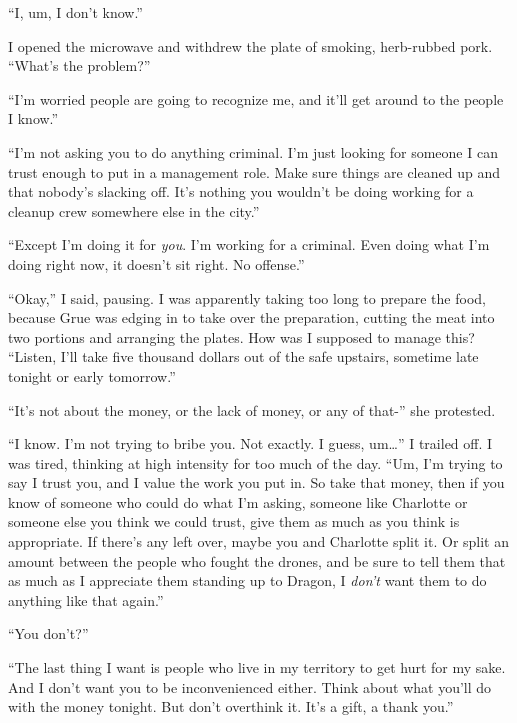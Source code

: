 ``I, um, I don't know.''



I opened the microwave and withdrew the plate of smoking, herb-rubbed pork.  ``What's the problem?''



``I'm worried people are going to recognize me, and it'll get around to the people I know.''



``I'm not asking you to do anything criminal.  I'm just looking for someone I can trust enough to put in a management role.  Make sure things are cleaned up and that nobody's slacking off.  It's nothing you wouldn't be doing working for a cleanup crew somewhere else in the city.''



``Except I'm doing it for \emph{you}.  I'm working for a criminal.  Even doing what I'm doing right now, it doesn't sit right.  No offense.''



``Okay,'' I said, pausing.  I was apparently taking too long to prepare the food, because Grue was edging in to take over the preparation, cutting the meat into two portions and arranging the plates.  How was I supposed to manage this?  ``Listen, I'll take five thousand dollars out of the safe upstairs, sometime late tonight or early tomorrow.''



``It's not about the money, or the lack of money, or any of that-'' she protested.



``I know.  I'm not trying to bribe you.  Not exactly.  I guess, um\ldots'' I trailed off.  I was tired, thinking at high intensity for too much of the day.  ``Um, I'm trying to say I trust you, and I value the work you put in.  So take that money, then if you know of someone who could do what I'm asking, someone like Charlotte or someone else you think we could trust, give them as much as you think is appropriate.  If there's any left over, maybe you and Charlotte split it.  Or split an amount between the people who fought the drones, and be sure to tell them that as much as I appreciate them standing up to Dragon, I \emph{don't} want them to do anything like that again.''



``You don't?''



``The last thing I want is people who live in my territory to get hurt for my sake.  And I don't want you to be inconvenienced either.  Think about what you'll do with the money tonight.  But don't overthink it.  It's a gift, a thank you.''



